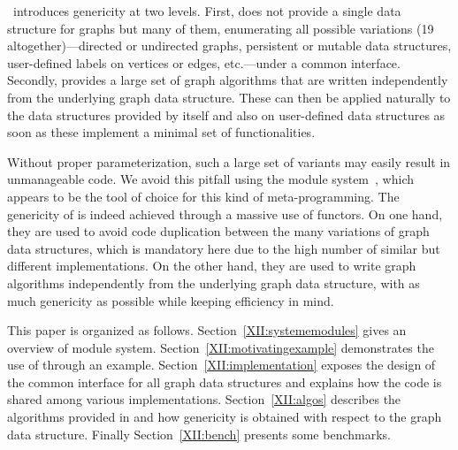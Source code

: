 \ocamlgraph\ introduces genericity at two levels. First, \ocamlgraph
does not provide a single data structure for graphs but many of them,
enumerating all possible variations (19 altogether)---directed or
undirected graphs, persistent or mutable data structures, user-defined
labels on vertices or edges, etc.---under a common interface.
Secondly, \ocamlgraph provides a large set of graph algorithms that
are written independently from the underlying graph data structure.
These can then be applied naturally to the data structures provided by
\ocamlgraph itself and also on user-defined data structures as soon as
these implement a minimal set of functionalities.

Without proper parameterization, such a large set of variants may
easily result in unmanageable code. We avoid this pitfall using the
\ocaml module system~\cite{XII:leroy00}, which appears to be the tool of
choice for this kind of meta-programming.  The genericity of
\ocamlgraph is indeed achieved through a massive use of \ocaml
functors. On one hand, they are used to avoid code duplication between
the many variations of graph data structures, which is mandatory here
due to the high number of similar but different implementations.  On
the other hand, they are used to write graph algorithms independently
from the underlying graph data structure, with as much genericity as
possible while keeping efficiency in mind.

This paper is organized as follows.  Section~\ref{XII:systememodules}
gives an overview of \ocaml module system.
Section~\ref{XII:motivatingexample} demonstrates the use of
\ocamlgraph through an example.  Section~\ref{XII:implementation}
exposes the design of the common interface for all graph data
structures and explains how the code is shared among various
implementations.  Section~\ref{XII:algos} describes the algorithms
provided in \ocamlgraph and how genericity is obtained with respect to
the graph data structure.  Finally Section~\ref{XII:bench} presents
some benchmarks.



